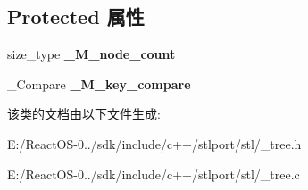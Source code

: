 \subsection*{Protected 属性}
\begin{DoxyCompactItemize}
\item 
\mbox{\label{class___rb__tree_a26b4a543410e04a4773ae62bbe3be85a}} 
size\+\_\+type {\bfseries \+\_\+\+M\+\_\+node\+\_\+count}
\item 
\mbox{\label{class___rb__tree_a632b2016b7e11b7587153270e9d7188b}} 
\+\_\+\+Compare {\bfseries \+\_\+\+M\+\_\+key\+\_\+compare}
\end{DoxyCompactItemize}


该类的文档由以下文件生成\+:\begin{DoxyCompactItemize}
\item 
E\+:/\+React\+O\+S-\/0../sdk/include/c++/stlport/stl/\+\_\+tree.\+h\item 
E\+:/\+React\+O\+S-\/0../sdk/include/c++/stlport/stl/\+\_\+tree.\+c\end{DoxyCompactItemize}
